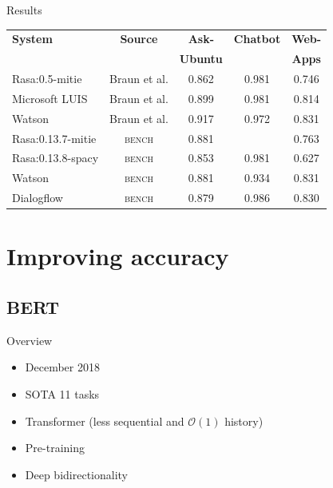 \documentclass[pdf]{beamer}
\begin{document}
    \begin{frame}{Results}
        \hspace*{-6mm}
        \begin{tabular}{l c c c c}
            \textbf{System} & \textbf{Source} & \textbf{Ask-} & \textbf{Chatbot} & \textbf{Web-} \\
            & & \textbf{Ubuntu} & & \textbf{Apps} \\
            \hline
            Rasa:0.5-mitie & Braun et al. & 0.862 & 0.981 & 0.746 \\
            Microsoft LUIS & Braun et al. & 0.899 & 0.981 & 0.814 \\
            Watson & Braun et al. & 0.917 & 0.972 & 0.831 \\
            Rasa:0.13.7-mitie & \textsc{bench} & 0.881 & & 0.763 \\
            Rasa:0.13.8-spacy & \textsc{bench} & 0.853 & 0.981 & 0.627 \\
            Watson & \textsc{bench} & 0.881 & 0.934 & 0.831 \\
            Dialogflow & \textsc{bench} & 0.879 & 0.986 & 0.830 \\ 
            \hline
        \end{tabular}
    \end{frame}

    \section{Improving accuracy}

    \subsection{BERT}
    \begin{frame}{Overview}
        \begin{itemize}
            \item December 2018
            \item SOTA 11 tasks\\[5mm]

            \item Transformer (less sequential and $\mathcal{O} (1)$ history)
            \item Pre-training
            \item Deep bidirectionality
        \end{itemize}
    \end{frame}
\end{document}
